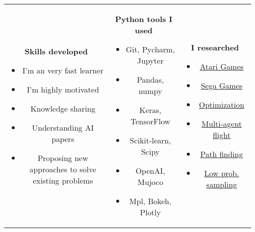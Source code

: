\documentclass[a4paper,11pt]{article}
\begin{document}
\begin{tabular}{ccc}
 \begin{minipage}{.30\linewidth}
        \large \textbf{Skills developed}
        \normalsize
        \begin{itemize}
          \item I'm an very fast learner
          \item I'm highly motivated
          \item Knowledge sharing
          \item Understanding AI papers
          \item Proposing new approaches to solve existing problems
          
        \end{itemize}
    \end{minipage} & 
    \begin{minipage}{.28\linewidth}
        \large \textbf{Python tools I used}
        \normalsize
        \begin{itemize}
          \item Git, Pycharm, Jupyter
          \item Pandas, numpy
          \item Keras, TensorFlow
          \item Scikit-learn, Scipy
          \item OpenAI, Mujoco 
          \item Mpl, Bokeh, Plotly
          
        \end{itemize}
    \end{minipage} & 
    \begin{minipage}{.24\linewidth}
        \large \textbf{I researched} 
        \normalsize
        \begin{itemize}
          \item \href{https://youtu.be/fq_uxGyuVhU?t=10m44s}{Atari Games}
          \item \href{https://youtu.be/jpXq-NCg1-E}{Sega Games}
          \item \href{https://www.youtube.com/watch?v=kSyae8URr54&t=79s}{Optimization}
          \item \href{https://www.youtube.com/watch?v=J9kW1lhT06A}{Multi-agent flight}
          \item \href{https://www.youtube.com/watch?v=R61FRUf-F6M}{Path finding}
          \item \href{https://youtu.be/HLbThk624jI?t=39s}{Low prob. sampling}
         
        \end{itemize}
    \end{minipage}
\end{tabular}
\end{document}

